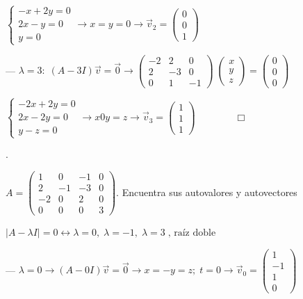 \noindent $\begin{cases} -x+2y=0\\2x-y=0\\y=0 \end{cases} \to x=y=0 \to \vec v_{2}= \left( \begin{matrix} 0\\0\\1  \end{matrix} \right)$


\noindent --- $\lambda=3:\; (A-3I)\vec v =\vec 0 \to \left( \begin{matrix} -2&2&0\\2&-3&0\\0&1&-1 \end{matrix} \right) \; \left( \begin{matrix} x\\y\\z \end{matrix} \right)=\left( \begin{matrix} 0\\0\\0 \end{matrix} \right)$

\noindent $\begin{cases} -2x+2y=0\\2x-2y=0\\y-z=0 \end{cases} \to x0y=z \to \vec v_{3}= \left( \begin{matrix} 1\\1\\1 \end{matrix} \right)$$\qquad \qquad \Box$




\begin{miejercicio}.

	$A=\left( \begin{matrix} 1&0&-1&0\\2&-1&-3&0\\-2&0&2&0\\0&0&0&3 \end{matrix} \right)$. Encuentra sus autovalores y autovectores
\end{miejercicio}


	$|A-\lambda I|=0 \leftrightarrow \lambda =0,\; \lambda =-1, \; \lambda=3 \; \text{, raíz doble }$
	
\noindent --- $\lambda = 0 \to (A-0I)\vec v=\vec 0 \to x=-y=z; \; t=0 \to \vec v_{0}= \left( \begin{matrix} 1\\-1\\1\\0 \end{matrix} \right)$

